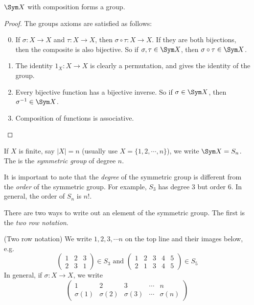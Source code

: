 \documentclass[a4paper]{article}
\begin{document}
\begin{thm}
  $\Sym X$ with composition forms a group.
\end{thm}

\begin{proof}
  The groups axioms are satisfied as follows:
  \begin{enumerate}[label=\arabic{*}.]
      \setcounter{enumi}{-1}
    \item If $\sigma: X\to X$ and $\tau: X\to X$, then $\sigma\circ\tau:X\to X$. If they are both bijections, then the composite is also bijective. So if $\sigma, \tau\in \Sym X$, then $\sigma\circ\tau\in\Sym X$.
    \item The identity $1_X:X\to X$ is clearly a permutation, and gives the identity of the group.
    \item Every bijective function has a bijective inverse. So if $\sigma\in \Sym X$, then $\sigma^{-1} \in \Sym X$.
    \item Composition of functions is associative.\qedhere
  \end{enumerate}
\end{proof}

\begin{defi}
  If $X$ is finite, say $|X| = n$ (usually use $X = \{1, 2, \cdots, n\}$), we write $\Sym X = S_n$. The is the \emph{symmetric group} of degree $n$.
\end{defi}
It is important to note that the \emph{degree} of the symmetric group is different from the \emph{order} of the symmetric group. For example, $S_3$ has degree 3 but order 6. In general, the order of $S_n$ is $n!$.

There are two ways to write out an element of the symmetric group. The first is the \emph{two row notation}.
\begin{notation}
  (Two row notation) We write $1, 2, 3, \cdots n$ on the top line and their images below, e.g.
  \[
    \begin{pmatrix}
      1 & 2 & 3\\
      2 & 3 & 1
    \end{pmatrix}\in S_3 \text{ and }
    \begin{pmatrix}
      1 & 2 & 3 & 4 & 5\\
      2 & 1 & 3 & 4 & 5
    \end{pmatrix}\in S_5
  \]
  In general, if $\sigma: X\to X$, we write
  \[
    \begin{pmatrix}
      1 & 2 & 3 &\cdots& n\\
      \sigma(1) & \sigma(2)&\sigma(3) &\cdots& \sigma{(n)}
    \end{pmatrix}
  \]
\end{notation}
\end{document}
